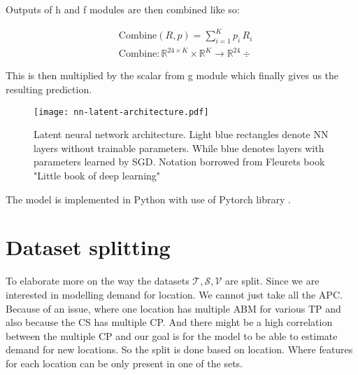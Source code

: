 \vspace{5mm}

\newpage

Outputs of h and f modules are then combined like so:

\begin{equation}
    \begin{split}
         & \text{Combine}(R,p) = \sum_{i=1}^K p_i \, R_i                                             \\
         & \text{Combine}: \mathbb{R}^{24 \times K} \times \mathbb{R}^K \rightarrow \mathbb{R}^{24}÷
    \end{split}
\end{equation}

This is then multiplied by the scalar from g module which finally gives us the resulting prediction.

\begin{figure}[hb]
    \texttt{[image: nn-latent-architecture.pdf]}
    \caption[Latent Neural Network Architecture]{Latent neural network architecture. Light blue rectangles denote NN layers without trainable parameters. While blue denotes layers with parameters learned by SGD. Notation borrowed from Fleurets book "Little book of deep learning"}
    \label{fig:nn-latent}
\end{figure}

The model is implemented in Python with use of Pytorch library .

\newpage


\section{Dataset splitting}
\label{sec:dataset-split}

To elaborate more on the way the datasets $\mathcal{T},\mathcal{S},\mathcal{V}$  are split. Since we are interested in modelling demand for location. We cannot just take all the \acrlong{APC}. Because of an issue, where one location has multiple \acrshort{ABM} for various \acrlong{TP} and also because the \acrshort{CS} has multiple \acrshort{CP}. And there might be a high correlation between the multiple \acrshort{CP} and our goal is for the model to be able to estimate demand for new locations. So the split is done based on location. Where features for each location can be only present in one of the sets.



